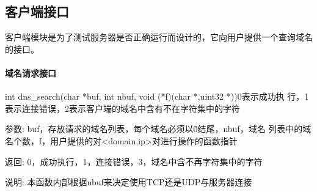 \subsection{客户端接口}
客户端模块是为了测试服务器是否正确运行而设计的，它向用户提供一个查询域名的接口。
\paragraph{域名请求接口}
{int  dns\_search(char *buf, int nbuf, void (*f)(char *,uint32 *))}{0表示成功执
行，1表示连接错误，2表示客户端的域名中含有不在字符集中的字符}
	\begin{compactdesc}
	\item[参数:]buf，存放请求的域名列表，每个域名必须以\'0\'结尾，nbuf，域名
	列表中的域名个数，f，用户提供的对<domain,ip>对进行操作的函数指针
	\item[返回:]0，成功执行，1，连接错误，3，域名中含不再字符集中的字符
	\item[说明:]本函数内部根据nbuf来决定使用TCP还是UDP与服务器连接
	\end{compactdesc}
%
